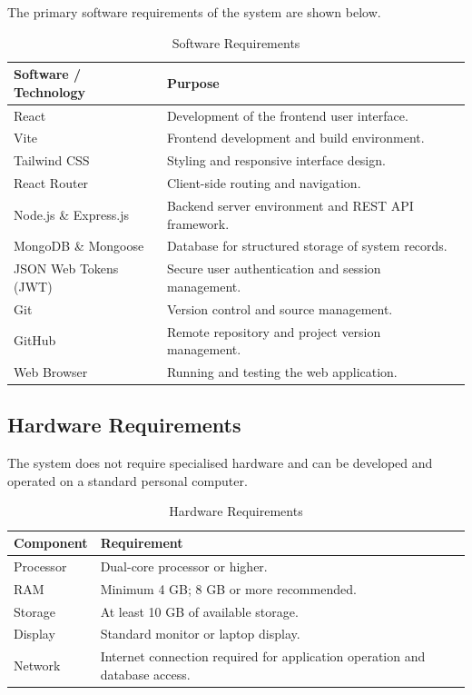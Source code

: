 The primary software requirements of the system are shown below.

\begin{table}[H]
\centering
\caption{Software Requirements}
\begin{tabular}{p{} p{}}
\toprule
\textbf{Software / Technology} & \textbf{Purpose} \\
\midrule
React & Development of the frontend user interface. \\
Vite & Frontend development and build environment. \\
Tailwind CSS & Styling and responsive interface design. \\
React Router & Client-side routing and navigation. \\
Node.js \& Express.js & Backend server environment and REST API framework. \\
MongoDB \& Mongoose & Database for structured storage of system records. \\
JSON Web Tokens (JWT) & Secure user authentication and session management. \\
Git & Version control and source management. \\
GitHub & Remote repository and project version management. \\
Web Browser & Running and testing the web application. \\
\bottomrule
\end{tabular}
\end{table}

\subsection{Hardware Requirements}

The system does not require specialised hardware and can be developed and operated on a standard personal computer.

\begin{table}[H]
\centering
\caption{Hardware Requirements}
\begin{tabular}{p{} p{}}
\toprule
\textbf{Component} & \textbf{Requirement} \\
\midrule
Processor & Dual-core processor or higher. \\
RAM & Minimum 4 GB; 8 GB or more recommended. \\
Storage & At least 10 GB of available storage. \\
Display & Standard monitor or laptop display. \\
Network & Internet connection required for application operation and database access. \\
\bottomrule
\end{tabular}
\end{table}

